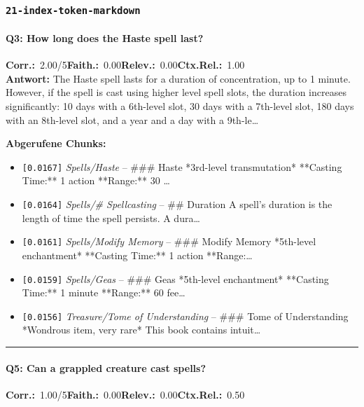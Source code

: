 \subsubsection*{\texttt{21-index-token-markdown}}
\label{app:samples:21_index_token_markdown}

\paragraph{Q3: How long does the Haste spell last?}
\noindent \textbf{Corr.:}~2.00/5\quad \textbf{Faith.:}~0.00\quad \textbf{Relev.:}~0.00\quad \textbf{Ctx.Rel.:}~1.00\\

\noindent\textbf{Antwort:} The Haste spell lasts for a duration of concentration, up to 1 minute. However, if the spell is cast using higher level spell slots, the duration increases significantly: 10 days with a 6th-level slot, 30 days with a 7th-level slot, 180 days with an 8th-level slot, and a year and a day with a 9th-le\ldots

\noindent\textbf{Abgerufene Chunks:}
\begin{itemize}[noitemsep, topsep=2pt]
  \item[\textbf{\#1}] \texttt{[0.0167]} \textit{Spells/Haste} -- \#\#\# Haste  *3rd-level transmutation*  **Casting Time:** 1 action  **Range:** 30 \ldots
  \item[\textbf{\#2}] \texttt{[0.0164]} \textit{Spells/# Spellcasting} -- \#\# Duration  A spell's duration is the length of time the spell persists. A dura\ldots
  \item[\textbf{\#3}] \texttt{[0.0161]} \textit{Spells/Modify Memory} -- \#\#\# Modify Memory  *5th-level enchantment*  **Casting Time:** 1 action  **Range:\ldots
  \item[\textbf{\#4}] \texttt{[0.0159]} \textit{Spells/Geas} -- \#\#\# Geas  *5th-level enchantment*  **Casting Time:** 1 minute  **Range:** 60 fee\ldots
  \item[\textbf{\#5}] \texttt{[0.0156]} \textit{Treasure/Tome of Understanding} -- \#\#\# Tome of Understanding  *Wondrous item, very rare*  This book contains intuit\ldots
\end{itemize}
\vspace{4pt}
\hrule
\vspace{6pt}

\paragraph{Q5: Can a grappled creature cast spells?}
\noindent \textbf{Corr.:}~1.00/5\quad \textbf{Faith.:}~0.00\quad \textbf{Relev.:}~0.00\quad \textbf{Ctx.Rel.:}~0.50\\

